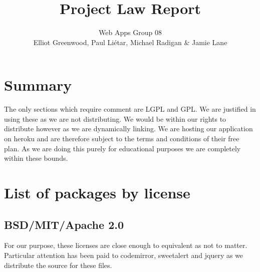 \documentclass[a4paper]{article}
\title{Project Law Report}
\author{Web Apps Group 08 \\ Elliot Greenwood, Paul Li\'etar, Michael Radigan \& Jamie Lane}
\date{}
\begin{document}
\maketitle

\section{Summary}
The only sections which require comment are LGPL and GPL. We are justified in using these as we are not distributing. We would be within our rights to distribute however as we are dynamically linking. We are hosting our application on heroku and are therefore subject to the terms and conditions of their free plan. As we are doing this purely for educational purposes we are completely within these bounds.

\section{List of packages by license}

\subsection{BSD/MIT/Apache 2.0}
	For our purpose, these licenses are close enough to equivalent as not to matter. Particular attention has been paid to codemirror, sweetalert and jquery as we distribute the source for these files.
\end{document}
